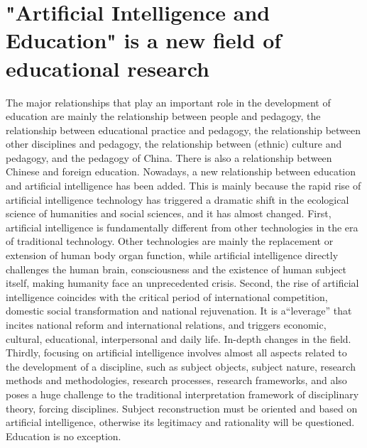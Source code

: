 \documentclass[11pt,en,authoryear]{elegantpaper}
\begin{document}
  \section{"Artificial Intelligence and Education" is a new field of educational research}
  The major relationships that play an important role in the development of education are mainly the relationship between people and pedagogy, the relationship between educational practice and pedagogy, the relationship between other disciplines and pedagogy, the relationship between (ethnic) culture and pedagogy, and the pedagogy of China. There is also a relationship between Chinese and foreign education. Nowadays, a new relationship between education and artificial intelligence has been added. This is mainly because the rapid rise of artificial intelligence technology has triggered a dramatic shift in the ecological science of humanities and social sciences, and it has almost changed. First, artificial intelligence is fundamentally different from other technologies in the era of traditional technology. Other technologies are mainly the replacement or extension of human body organ function, while artificial intelligence directly challenges the human brain, consciousness and the existence of human subject itself, making humanity face an unprecedented crisis. Second, the rise of artificial intelligence coincides with the critical period of international competition, domestic social transformation and national rejuvenation. It is a“leverage” that incites national reform and international relations, and triggers economic, cultural, educational, interpersonal and daily life. In-depth changes in the field. Thirdly, focusing on artificial intelligence involves almost all aspects related to the development of a discipline, such as subject objects, subject nature, research methods and methodologies, research processes, research frameworks, and also poses a huge challenge to the traditional interpretation framework of disciplinary theory, forcing disciplines. Subject reconstruction must be oriented and based on artificial intelligence, otherwise its legitimacy and rationality will be questioned. Education is no exception.
\end{document}
